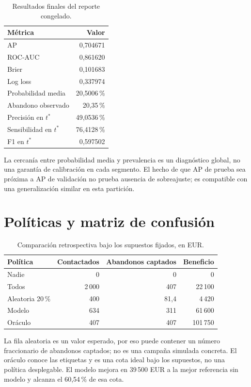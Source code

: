 \documentclass[11pt,a4paper,oneside]{report}
\begin{document}
\begin{table}[htbp]\centering
\caption{Resultados finales del reporte congelado.}\label{tab:final}
\begin{tabular}{@{}lr@{}}\toprule
Métrica & Valor \\\midrule
AP & 0,704671 \\
ROC-AUC & 0,861620 \\
Brier & 0,101683 \\
Log loss & 0,337974 \\
Probabilidad media & 20,5006\,\% \\
Abandono observado & 20,35\,\% \\
Precisión en $t^*$ & 49,0536\,\% \\
Sensibilidad en $t^*$ & 76,4128\,\% \\
F1 en $t^*$ & 0,597502 \\\bottomrule
\end{tabular}
\end{table}
La cercanía entre probabilidad media y prevalencia es un diagnóstico global,
no una garantía de calibración en cada segmento. El hecho de que AP de prueba
sea próxima a AP de validación no prueba ausencia de sobreajuste; es compatible
con una generalización similar en esta partición.

\section{Políticas y matriz de confusión}
\begin{table}[htbp]\centering\small
\caption{Comparación retrospectiva bajo los supuestos fijados, en EUR.}
\begin{tabular}{@{}lrrr@{}}\toprule
Política & Contactados & Abandonos captados & Beneficio \\\midrule
Nadie & 0 & 0 & 0 \\
Todos & 2\,000 & 407 & 22\,100 \\
Aleatoria 20\,\% & 400 & 81,4 & 4\,420 \\
Modelo & 634 & 311 & 61\,600 \\
Oráculo & 407 & 407 & 101\,750 \\\bottomrule
\end{tabular}
\end{table}
La fila aleatoria es un valor esperado, por eso puede contener un número
fraccionario de abandonos captados; no es una campaña simulada concreta.
El oráculo conoce las etiquetas y es una cota ideal bajo los supuestos, no
una política desplegable. El modelo mejora en 39\,500 EUR a la mejor referencia
sin modelo y alcanza el 60,54\,\% de esa cota.
\end{document}
